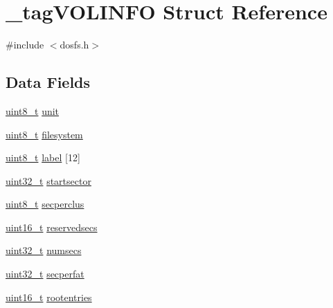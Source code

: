 \hypertarget{struct__tag_v_o_l_i_n_f_o}{\section{\-\_\-tag\-V\-O\-L\-I\-N\-F\-O Struct Reference}
\label{struct__tag_v_o_l_i_n_f_o}
}


{\ttfamily \#include $<$dosfs.\-h$>$}

\subsection*{Data Fields}
\begin{DoxyCompactItemize}
\item 
\hyperlink{stdint_8h_aba7bc1797add20fe3efdf37ced1182c5}{uint8\-\_\-t} \hyperlink{struct__tag_v_o_l_i_n_f_o_a35c7c89f02f3f0d63d0a1246d1f6a20f}{unit}
\item 
\hyperlink{stdint_8h_aba7bc1797add20fe3efdf37ced1182c5}{uint8\-\_\-t} \hyperlink{struct__tag_v_o_l_i_n_f_o_a574983d37caae8401e8e3cfb01b2e8ce}{filesystem}
\item 
\hyperlink{stdint_8h_aba7bc1797add20fe3efdf37ced1182c5}{uint8\-\_\-t} \hyperlink{struct__tag_v_o_l_i_n_f_o_a1e4ccac1ea8916bde65680e26af117f6}{label} \mbox{[}12\mbox{]}
\item 
\hyperlink{stdint_8h_a435d1572bf3f880d55459d9805097f62}{uint32\-\_\-t} \hyperlink{struct__tag_v_o_l_i_n_f_o_a81725e5affac42409e2efde497cd9d67}{startsector}
\item 
\hyperlink{stdint_8h_aba7bc1797add20fe3efdf37ced1182c5}{uint8\-\_\-t} \hyperlink{struct__tag_v_o_l_i_n_f_o_aab3ee1dd155d279aa09dca88f29f4d37}{secperclus}
\item 
\hyperlink{stdint_8h_a273cf69d639a59973b6019625df33e30}{uint16\-\_\-t} \hyperlink{struct__tag_v_o_l_i_n_f_o_a31d91d308b6a9c9064ea5ef5a79f1e7a}{reservedsecs}
\item 
\hyperlink{stdint_8h_a435d1572bf3f880d55459d9805097f62}{uint32\-\_\-t} \hyperlink{struct__tag_v_o_l_i_n_f_o_a4ab4874e4f9da06c1cdf5c1d03e1ce6d}{numsecs}
\item 
\hyperlink{stdint_8h_a435d1572bf3f880d55459d9805097f62}{uint32\-\_\-t} \hyperlink{struct__tag_v_o_l_i_n_f_o_a5eecad9a5d1a1582a86b9b965346f68b}{secperfat}
\item 
\hyperlink{stdint_8h_a273cf69d639a59973b6019625df33e30}{uint16\-\_\-t} \hyperlink{struct__tag_v_o_l_i_n_f_o_a0e9b10c6cee9604eb31bf11f6d2b729a}{rootentries}
\item 

\end{DoxyCompactItemize}
